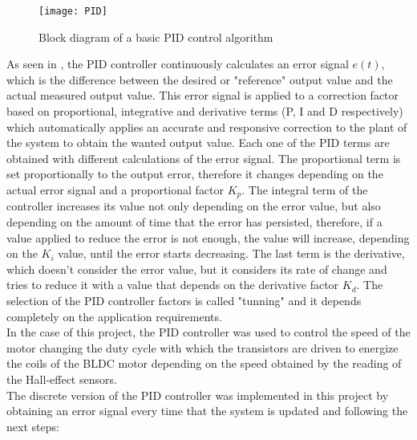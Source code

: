 \begin{figure} [H]
\centering\texttt{[image: PID]}
\caption{Block diagram of a basic PID control algorithm}
\label{fig:PID_block_diagram}
\end{figure}

As seen in , the PID controller continuously calculates an error signal $e(t)$, which is the difference between the desired or "reference" output value and the actual measured output value. This error signal is applied to a correction factor based on proportional, integrative and derivative terms (P, I and D respectively) which automatically applies an accurate and responsive correction to the plant of the system to obtain the wanted output value. Each one of the PID terms are obtained with different calculations of the error signal. The proportional term is set proportionally to the output error, therefore it changes depending on the actual error signal and a proportional factor $K_p$. The integral term of the controller increases its value not only depending on the error value, but also depending on the amount of time that the error has persisted, therefore, if a value applied to reduce the error is not enough, the value will increase, depending on the $K_i$ value, until the error starts decreasing. The last term is the derivative, which doesn't consider the error value, but it considers its rate of change and tries to reduce it with a value that depends on the derivative factor $K_d$. The selection of the PID controller factors is called "tunning" and it depends completely on the application requirements.\\

In the case of this project, the PID controller was used to control the speed of the motor changing the duty cycle with which the transistors are driven to energize the coils of the BLDC motor depending on the speed obtained by the reading of the Hall-effect sensors.\\

The discrete version of the PID controller was implemented in this project by obtaining an error signal every time that the system is updated and following the next steps:

